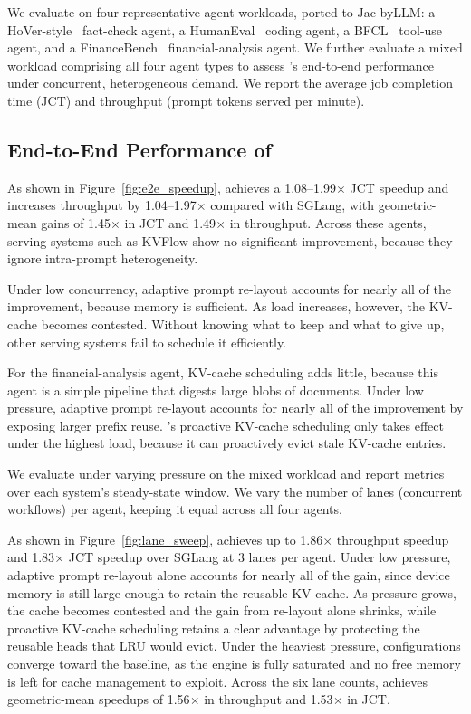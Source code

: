 We evaluate \sysname on four representative agent workloads, ported to Jac byLLM: a HoVer-style~\cite{jiang2020hover} fact-check agent, a HumanEval~\cite{chen2021evaluating} coding agent, a BFCL~\cite{patil2025bfcl} tool-use agent, and a FinanceBench~\cite{islam2023financebench} financial-analysis agent. We further evaluate a mixed workload comprising all four agent types to assess \sysname's end-to-end performance under concurrent, heterogeneous demand. We report the average job completion time (JCT) and throughput (prompt tokens served per minute).


\subsection{End-to-End Performance of \sysname}
As shown in Figure~\ref{fig:e2e_speedup}, \sysname achieves a 1.08--1.99$\times$ JCT speedup and increases throughput by 1.04--1.97$\times$ compared with SGLang, with geometric-mean gains of 1.45$\times$ in JCT and 1.49$\times$ in throughput. Across these agents, serving systems such as KVFlow show no significant improvement, because they ignore intra-prompt heterogeneity. 

Under low concurrency, adaptive prompt re-layout accounts for nearly all of the improvement, because memory is sufficient. As load increases, however, the KV-cache becomes contested. Without knowing what to keep and what to give up, other serving systems fail to schedule it efficiently. 

For the financial-analysis agent, KV-cache scheduling adds little, because this agent is a simple pipeline that digests large blobs of documents. Under low pressure, adaptive prompt re-layout accounts for nearly all of the improvement by exposing larger prefix reuse. \sysname's proactive KV-cache scheduling only takes effect under the highest load, because it can proactively evict stale KV-cache entries. 

We evaluate \sysname under varying pressure on the mixed workload and report metrics over each system's steady-state window. We vary the number of lanes (concurrent workflows) per agent, keeping it equal across all four agents.

As shown in Figure~\ref{fig:lane_sweep}, \sysname achieves up to 1.86$\times$ throughput speedup and 1.83$\times$ JCT speedup over SGLang at 3 lanes per agent. Under low pressure, adaptive prompt re-layout alone accounts for nearly all of the gain, since device memory is still large enough to retain the reusable KV-cache. As pressure grows, the cache becomes contested and the gain from re-layout alone shrinks, while proactive KV-cache scheduling retains a clear advantage by protecting the reusable heads that LRU would evict. Under the heaviest pressure, configurations converge toward the baseline, as the engine is fully saturated and no free memory is left for cache management to exploit. Across the six lane counts, \sysname achieves geometric-mean speedups of 1.56$\times$ in throughput and 1.53$\times$ in JCT.

